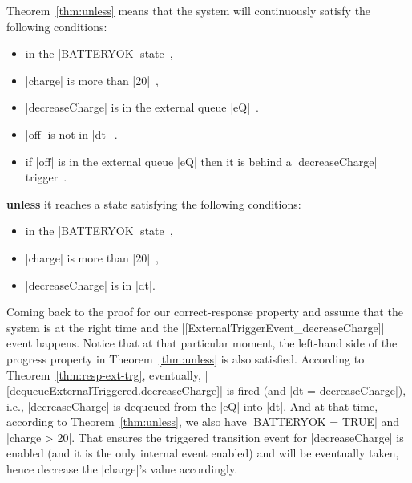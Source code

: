 Theorem~\ref{thm:unless} means that the system will continuously
satisfy the following conditions:
\begin{itemize}
\item in the |BATTERYOK| state~,
  
\item |charge| is more than |20|~,
  
\item |decreaseCharge| is in the external queue |eQ|~.
  
\item |off| is not in |dt|~.
  
\item if |off| is in the external queue |eQ| then it is behind a
  |decreaseCharge| trigger~.
\end{itemize}
\textbf{unless} it reaches a state satisfying the following conditions:
\begin{itemize}
\item in the |BATTERYOK| state~,
  
\item |charge| is more than |20|~,
  
\item |decreaseCharge| is in |dt|.
\end{itemize}

Coming back to the proof for our correct-response property and assume
that the system is at the right time and the
|[ExternalTriggerEvent_decreaseCharge]| event happens.  Notice that at
that particular moment, the left-hand side of the progress property in
Theorem~\ref{thm:unless} is also satisfied.  According to
Theorem~\ref{thm:resp-ext-trg}, eventually,
|[dequeueExternalTriggered.decreaseCharge]| is fired (and %
|dt = {decreaseCharge}|), %
i.e., |decreaseCharge| is dequeued from the |eQ| into |dt|. And at
that time, according to Theorem~\ref{thm:unless}, we also have
|BATTERYOK = TRUE| and |charge > 20|.  That ensures the triggered
transition event for |decreaseCharge| is enabled (and it is the only
internal event enabled) and will be eventually taken, hence decrease
the |charge|'s value accordingly.



